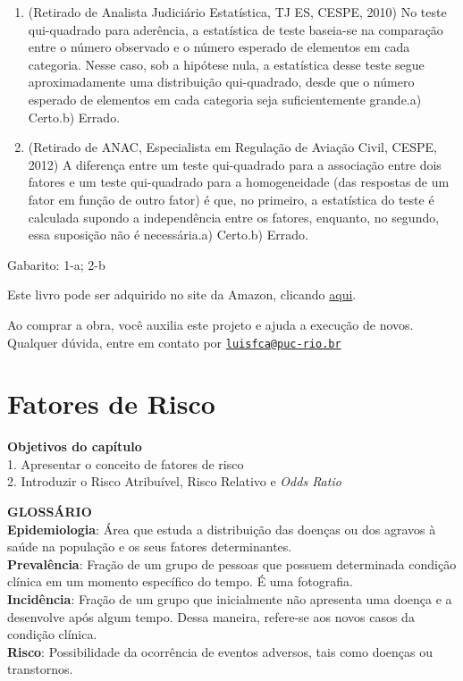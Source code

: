 \documentclass[
]{book}
\newenvironment{objectives}{
  \definecolor{shadecolor}{rgb}{0, 0, 0}  %
  \color{white}
  \begin{shaded}}
 {\end{shaded}}
\begin{document}
\begin{enumerate}
\def\labelenumi{\arabic{enumi}.}
\item
  (Retirado de Analista Judiciário Estatística, TJ ES, CESPE, 2010) No teste qui-quadrado para aderência, a estatística de teste baseia-se na comparação entre o número observado e o número esperado de elementos em cada categoria. Nesse caso, sob a hipótese nula, a estatística desse teste segue aproximadamente uma distribuição qui-quadrado, desde que o número esperado de elementos em cada categoria seja suficientemente grande.a) Certo.b) Errado.
\item
  (Retirado de ANAC, Especialista em Regulação de Aviação Civil, CESPE, 2012) A diferença entre um teste qui-quadrado para a associação entre dois fatores e um teste qui-quadrado para a homogeneidade (das respostas de um fator em função de outro fator) é que, no primeiro, a estatística do teste é calculada supondo a independência entre os fatores, enquanto, no segundo, essa suposição não é necessária.a) Certo.b) Errado.
\end{enumerate}

Gabarito: 1-a; 2-b

Este livro pode ser adquirido no site da Amazon, clicando \href{https://www.amazon.com.br/gp/product/B097CP7T9M?pf_rd_r=RDZC8XYMBC1WY69T0J8K\&pf_rd_p=abb22e6b-8812-4b76-a424-5f0b098d2c90\&pd_rd_r=ceec1911-f409-4acd-ac8f-2d5bc68dac43\&pd_rd_w=wMUzJ\&pd_rd_wg=ZK85a\&ref_=pd_gw_unk}{aqui}.

Ao comprar a obra, você auxilia este projeto e ajuda a execução de novos. Qualquer dúvida, entre em contato por \href{mailto:luisfca@puc-rio.br}{\nolinkurl{luisfca@puc-rio.br}}

\hypertarget{fatores-de-risco}{%
\chapter{Fatores de Risco}\label{fatores-de-risco}}

\begin{objectives}
\textbf{Objetivos do capítulo}\\
1. Apresentar o conceito de fatores de risco\\
2. Introduzir o Risco Atribuível, Risco Relativo e \emph{Odds Ratio}

\end{objectives}

\textbf{GLOSSÁRIO}\\
\textbf{Epidemiologia}: Área que estuda a distribuição das doenças ou dos agravos à saúde na população e os seus fatores determinantes.\\
\textbf{Prevalência}: Fração de um grupo de pessoas que possuem determinada condição clínica em um momento específico do tempo. É uma fotografia.\\
\textbf{Incidência}: Fração de um grupo que inicialmente não apresenta uma doença e a desenvolve após algum tempo. Dessa maneira, refere-se aos novos casos da condição clínica.\\
\textbf{Risco}: Possibilidade da ocorrência de eventos adversos, tais como doenças ou transtornos.
\end{document}
